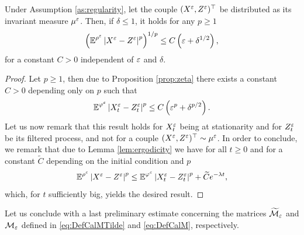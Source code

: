 \documentclass[10pt]{article}
\begin{document}
\begin{appendices}
\begin{corollary} \label{cor:distanceZandX} Under Assumption \ref{as:regularity}, let the couple $(X^\varepsilon, Z^\varepsilon)^\top$ be distributed as its invariant measure $\mu^\varepsilon$. Then, if $\delta \leq 1$, it holds for any $p \geq 1$
	\begin{equation}
	\left(\operatorname{\mathbb{E}}^{\rho^\varepsilon} \left\lvert X^\varepsilon - Z^\varepsilon\right\rvert^p\right)^{1/p} \leq C\left(\varepsilon + \delta^{1/2}\right),
	\end{equation}
	for a constant $C > 0$ independent of $\varepsilon$ and $\delta$.
\end{corollary}
\begin{proof}
	Let $p \geq 1$, then due to Proposition \ref{prop:zeta} there exists a constant $C > 0$ depending only on $p$ such that
	\begin{equation}
	\operatorname{\mathbb{E}}^{\varphi^\varepsilon}\left\lvert X_t^\varepsilon - Z_t^\varepsilon\right\rvert^p \leq C\left(\varepsilon^p + \delta^{p/2}\right).
	\end{equation}
	Let us now remark that this result holds for $X_t^\varepsilon$ being at stationarity and for $Z_t^\varepsilon$ be its filtered process, and not for a couple $(X^\varepsilon, Z^\varepsilon)^\top \sim \mu^\varepsilon$. In order to conclude, we remark that due to Lemma \ref{lem:ergodicity} we have for all $t \geq 0$ and for a constant $\widetilde C$ depending on the initial condition and $p$  
	\begin{equation}
	\operatorname{\mathbb{E}}^{\rho^\varepsilon} \left\lvert X^\varepsilon - Z^\varepsilon\right\rvert^p \leq \operatorname{\mathbb{E}}^{\varphi^\varepsilon}\left\lvert X_t^\varepsilon - Z_t^\varepsilon\right\rvert^p + \widetilde Ce^{-\lambda t},
	\end{equation}
	which, for $t$ sufficiently big, yields the desired result.
\end{proof}

Let us conclude with a last preliminary estimate concerning the matrices $\widetilde{\mathcal M}_\varepsilon$ and $\mathcal M_\varepsilon$ defined in \eqref{eq:DefCalMTilde} and \eqref{eq:DefCalM}, respectively.


\end{appendices}
\end{document}
